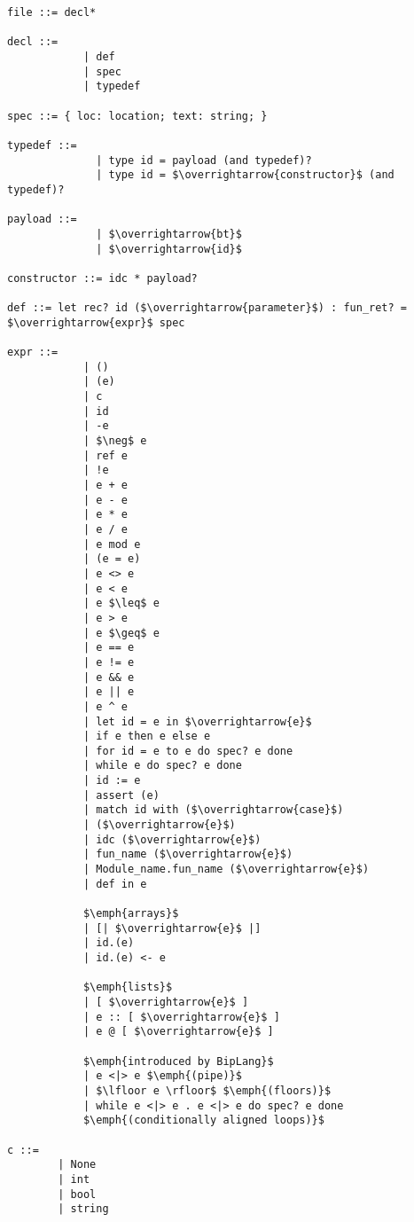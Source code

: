 \begin{lstlisting}[mathescape, basicstyle=\ttfamily, columns=flexible,
                    emph={type, and, let, rec, if, then, else, mod, in, for, while, do, done, to, begin, end, assert, match, with, of, open, include,ref},
                    emphstyle=\ttfamily\bfseries\color{myorange}]
file ::= decl*

decl ::= 
            | def
            | spec
            | typedef

spec ::= { loc: location; text: string; }

typedef ::=
              | type id = payload (and typedef)?
              | type id = $\overrightarrow{constructor}$ (and typedef)?

payload ::= 
              | $\overrightarrow{bt}$
              | $\overrightarrow{id}$

constructor ::= idc * payload?

def ::= let rec? id ($\overrightarrow{parameter}$) : fun_ret? = $\overrightarrow{expr}$ spec

expr ::=
            | ()
            | (e)
            | c
            | id
            | -e
            | $\neg$ e
            | ref e 
            | !e
            | e + e
            | e - e
            | e * e
            | e / e
            | e mod e
            | (e = e)
            | e <> e
            | e < e
            | e $\leq$ e
            | e > e
            | e $\geq$ e
            | e == e
            | e != e
            | e && e
            | e || e 
            | e ^ e
            | let id = e in $\overrightarrow{e}$
            | if e then e else e
            | for id = e to e do spec? e done 
            | while e do spec? e done 
            | id := e
            | assert (e)
            | match id with ($\overrightarrow{case}$)
            | ($\overrightarrow{e}$)
            | idc ($\overrightarrow{e}$)
            | fun_name ($\overrightarrow{e}$)
            | Module_name.fun_name ($\overrightarrow{e}$)
            | def in e
            
            $\emph{arrays}$
            | [| $\overrightarrow{e}$ |]
            | id.(e)
            | id.(e) <- e

            $\emph{lists}$
            | [ $\overrightarrow{e}$ ]
            | e :: [ $\overrightarrow{e}$ ]
            | e @ [ $\overrightarrow{e}$ ]

            $\emph{introduced by BipLang}$
            | e <|> e $\emph{(pipe)}$
            | $\lfloor e \rfloor$ $\emph{(floors)}$
            | while e <|> e . e <|> e do spec? e done
            $\emph{(conditionally aligned loops)}$

c ::=
        | None
        | int
        | bool
        | string

\end{lstlisting}

